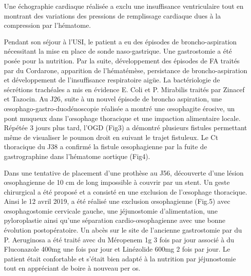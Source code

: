 \documentclass[./tfe]{subfiles}
\begin{document}
Une échographie cardiaque réalisée a exclu une insuffisance ventriculaire tout en montrant des variations des pressions de remplissage cardiaque dues à la compression par l'hématome.

Pendant son séjour à l’USI, le patient a eu des épisodes de broncho-aspiration nécessitant la mise en place de sonde naso-gastrique. Une gastrostomie a été posée pour la nutrition. Par la suite, développement des épisodes de FA traités par du Cordarone, apparition de l’hématémèse, persistance de broncho-aspiration et développement de l’insuffisance respiratoire aigüe. La bactériologie de sécrétions trachéales a mis en évidence E. Coli et P. Mirabilis traités par Zinacef et Tazocin. Au J26, suite à un nouvel épisode de broncho aspiration, une œsophago-gastro-duodénoscopie réalisée a montré une œsophagite érosive, un pont muqueux dans l'œsophage thoracique et une impaction alimentaire locale. Répétée 3 jours plus tard, l’OGD (Fig3) a démontré plusieurs fistules permettant même de visualiser le poumon droit en suivant le trajet fistuleux. Le Ct thoracique du J38 a confirmé la fistule œsophagienne par la fuite de gastrographine dans l’hématome aortique (Fig4).

Dans une tentative de placement d’une prothèse au J56, découverte d’une lésion œsophagienne de 10 cm de long impossible à couvrir par un stent. Un geste chirurgical a été proposé et a consisté en une exclusion de l'œsophage thoracique. Ainsi le 12 avril 2019, a été réalisé une exclusion œsophagienne (Fig.5) avec œsophagostomie cervicale gauche, une jéjunostomie d’alimentation, une pyloroplastie ainsi qu’une séparation cardio-œsophagienne avec une bonne évolution postopératoire. Un abcès sur le site de l’ancienne gastrostomie par du P. Aeruginosa a été traité avec du Méropenem 1g  3 fois par jour associé à du Fluconazole 400mg une fois par jour et Linézolide 600mg 2 fois par jour. Le patient était confortable et s’était bien adapté à la nutrition par jéjunostomie tout en appréciant de boire à nouveau per os.
\end{document}
